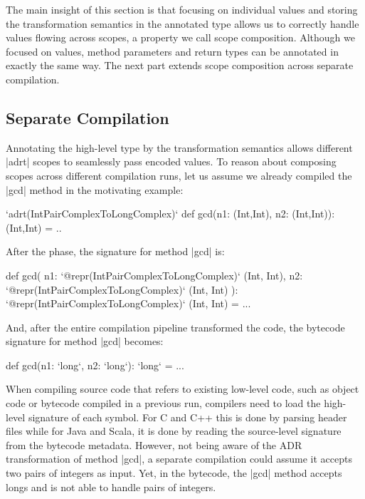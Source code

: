 The main insight of this section is that focusing on individual values and storing the transformation semantics in the annotated type allows us to correctly handle values flowing across scopes, a property we call scope composition. Although we focused on values, method parameters and return types can be annotated in exactly the same way. The next part extends scope composition across separate compilation.


\subsection{Separate Compilation}
\label{sec:ildl:separate-compilation}

Annotating the high-level type by the transformation semantics allows different |adrt| scopes to seamlessly pass encoded values. To reason about composing scopes across different compilation runs, let us assume we already compiled the |gcd| method in the motivating example:

\begin{lstlisting-nobreak}
`adrt(IntPairComplexToLongComplex)` {
  def gcd(n1: (Int,Int), n2: (Int,Int)): (Int,Int) = ..
}
\end{lstlisting-nobreak}

After the \inject{} phase, the signature for method |gcd| is:

\begin{lstlisting-nobreak}
def gcd(
    n1: `@repr(IntPairComplexToLongComplex)` (Int, Int),
    n2: `@repr(IntPairComplexToLongComplex)` (Int, Int)
  ): `@repr(IntPairComplexToLongComplex)` (Int, Int) = ...
\end{lstlisting-nobreak}

And, after the entire compilation pipeline transformed the code, the bytecode signature for method |gcd| becomes:

\begin{lstlisting-nobreak}
def gcd(n1: `long`, n2: `long`): `long` = ...
\end{lstlisting-nobreak}

When compiling source code that refers to existing low-level code, such as object code or bytecode compiled in a previous run, compilers need to load the high-level signature of each symbol. For C and C++ this is done by parsing header files while for Java and Scala, it is done by reading the source-level signature from the bytecode metadata. However, not being aware of the ADR transformation of method |gcd|, a separate compilation could assume it accepts two pairs of integers as input. Yet, in the bytecode, the |gcd| method accepts longs and is not able to handle pairs of integers.

